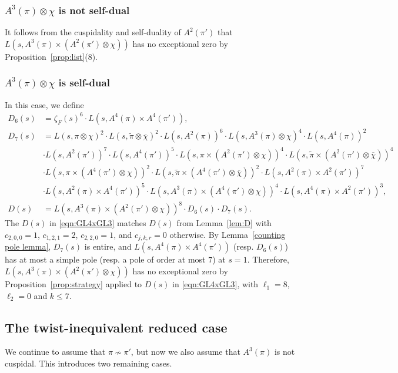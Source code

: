 \documentclass[11pt]{amsart}
\theoremstyle{remark}
\renewcommand{\bar}{\overline}
\renewcommand{\tilde}{\widetilde}
\numberwithin{equation}{section}
\begin{document}
\subsubsection{$A^3(\pi)\otimes\chi$ is not self-dual}
It follows from the cuspidality and self-duality of $A^2(\pi')$ that $L(s,A^3(\pi)\times(A^2(\pi')\otimes\chi))$ has {\color{red}no exceptional zero} by Proposition~\ref{prop:list}(8).
\subsubsection{$A^3(\pi)\otimes\chi$ is self-dual}  In this case, we define
\begin{equation}
\label{eqn:GL4xGL3}
\begin{aligned}
    D_6(s) &= \zeta_F(s)^6 \cdot L(s,A^4(\pi) \times A^4(\pi')), \\
    D_7(s) &= L(s,\pi\otimes\chi)^2 \cdot L(s,\tilde{\pi}\otimes\bar{\chi})^2 \cdot  L(s,A^2(\pi))^6 \cdot  L(s,A^3(\pi)\otimes\chi)^4 \cdot  L(s,A^4(\pi))^2 \\
    &\cdot  L(s,A^2(\pi'))^7 \cdot L(s,A^4(\pi'))^5 \cdot  L(s,\pi\times(A^2(\pi')\otimes\chi))^4\cdot L(s,\tilde{\pi}\times(A^2(\pi')\otimes\bar{\chi}))^4 \\
    &\cdot L(s,\pi\times(A^4(\pi')\otimes\chi))^2\cdot L(s,\tilde{\pi}\times(A^4(\pi')\otimes\bar{\chi}))^2 \cdot L(s,A^2(\pi)\times A^2(\pi'))^7 \\
    &\cdot L(s,A^2(\pi)\times A^4(\pi'))^5\cdot L(s,A^3(\pi)\times(A^4(\pi')\otimes\chi))^4 \cdot L(s,A^4(\pi)\times A^2(\pi'))^3,\\
    D(s) & = L(s,A^3(\pi) \times(A^2(\pi')\otimes\chi))^8 \cdot D_6(s) \cdot D_7(s).
\end{aligned}
\end{equation}
The $D(s)$ in \eqref{eqn:GL4xGL3} matches $D(s)$ from Lemma~\ref{lem:D} with $c_{2,0,0} = 1$,  $c_{1,2,1} = 2$, $c_{2,2,0} = 1$, and $c_{j,k,r}=0$ otherwise.  By Lemma~\ref{counting pole lemma}, $D_7(s)$ is entire, and $L(s,A^4(\pi) \times A^4(\pi'))$ (resp. $D_6(s)$) has at most a simple pole (resp. a pole of order at most $7$) at $s=1$.  Therefore, $L(s,A^3(\pi)\times(A^2(\pi')\otimes\chi))$ has {\color{red}no exceptional zero} by Proposition~\ref{prop:strategy} applied to $D(s)$ in \eqref{eqn:GL4xGL3}, with $\ell_1 = 8$, $\ell_2 = 0$ and $k \leq 7$.

\subsection{The twist-inequivalent reduced case}
We continue to assume that $\pi\not\sim\pi'$, but now we also assume that $A^3(\pi)$ is not cuspidal.  This introduces two remaining cases.
\end{document}

